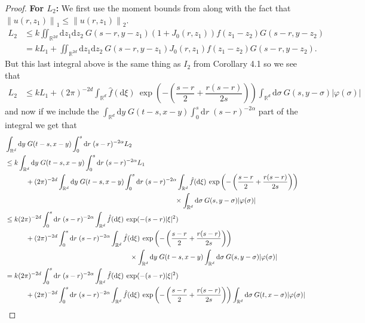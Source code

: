 \documentclass[a4paper,11pt]{article}
\numberwithin{equation}{section}
\theoremstyle{plain}
\theoremstyle{definition}
\newcommand{\R}{\mathbb{R}}
\newcommand{\Norm}[1]{\left\|  #1   \right\|}
\newcommand{\ud}{\ensuremath{\mathrm{d}}}
\begin{document}
\begin{proof}
\noindent \textbf{For $L_2$:} We first use the moment bounds from \cite{CH16Comparison} along with the fact that $\Norm{u(r,z_1)}_1 \le \Norm{u(r,z_1)}_2$.
\begin{align*}
L_2 & \le k\iint_{\R^{2d}}\ud z_1 \ud z_2 \:G(s-r,y-z_1)(1+J_0(r,z_1))f(z_1-z_2)G(s-r,y-z_2)
\\ &= kL_1 + \iint_{\R^{2d}}\ud z_1 \ud z_2 \:G(s-r,y-z_1)J_0(r,z_1)f(z_1-z_2)G(s-r,y-z_2).
\end{align*}
But this last integral above is the same thing as $I_2$ from Corollary 4.1 so we see that 
\begin{align*}
L_2 &\le kL_1 + (2\pi)^{-2d}\int_{\R^d}\hat f(\ud \xi) \: \exp\left(-\left(\dfrac{s-r}{2}+\dfrac{r(s-r)}{2s}\right)\right) \int_{\R^d}\ud \sigma \: G(s,y-\sigma)|\varphi(\sigma)|
\end{align*}
and now if we include the $\int_{\R^d}\ud y \;G(t-s,x-y)\int_0^s\ud r\; (s-r)^{-2\alpha}$ part of the integral we get that 
\begin{align*}
	   & \int_{\R^d}\ud y \;G(t-s,x-y)\int_0^s\ud r\; (s-r)^{-2\alpha} L_2
	\\ & \le k\int_{\R^d}\ud y \;G(t-s,x-y)\int_0^s\ud r\; (s-r)^{-2\alpha} L_1
	\\ & \hspace{3em}+ (2\pi)^{-2d}\int_{\R^d}\ud y \;G(t-s,x-y)\int_0^s\ud r\; (s-r)^{-2\alpha}\int_{\R^d}\hat f(\ud \xi) \: \exp\left(-\left(\dfrac{s-r}{2}+\dfrac{r(s-r)}{2s}\right)\right)
	\\ & \hspace{24.5em} \times  \int_{\R^d}\ud \sigma \: G(s,y-\sigma)|\varphi(\sigma)|
	\\ & \le k (2\pi)^{-2d} \int_0^s\ud r\; (s-r)^{-2\alpha}\int_{\R^d}\hat f (\ud \xi)\: \exp(-(s-r)|\xi|^2)
	\\ & \hspace{3em}+ (2\pi)^{-2d} \int_0^s\ud r\; (s-r)^{-2\alpha}\int_{\R^d}\hat f(\ud \xi) \: \exp\left(-\left(\dfrac{s-r}{2}+\dfrac{r(s-r)}{2s}\right)\right)
	\\ & \hspace{18 em} \times\int_{\R^d}\ud y \;G(t-s,x-y) \int_{\R^d}\ud \sigma \: G(s,y-\sigma)|\varphi(\sigma)|
	\\ & = k  (2\pi)^{-2d} \int_0^s\ud r\; (s-r)^{-2\alpha}\int_{\R^d}\hat f (\ud \xi)\: \exp(-(s-r)|\xi|^2)
	\\ & \hspace{3em} +(2\pi)^{-2d}\int_0^s\ud r\; (s-r)^{-2\alpha}\int_{\R^d}\hat f(\ud \xi) \: \exp\left(-\left(\dfrac{s-r}{2}+\dfrac{r(s-r)}{2s}\right)\right)\int_{\R^d}\ud \sigma \: G(t,x-\sigma)|\varphi(\sigma)|

\end{align*}
\end{proof}
\end{document}
